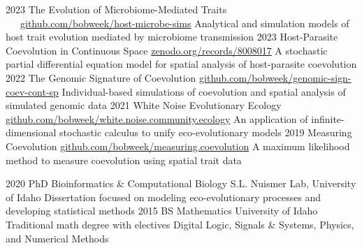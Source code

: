 \documentclass[9pt]{developercv} %
\begin{document}
\begin{entrylist}
        \entry
		{2023}
		{The Evolution of Microbiome-Mediated Traits}
		{\ \ \ \href{https://github.com/bobweek/host-microbe-sims}{github.com/bobweek/host-microbe-sims}}
		{%
        Analytical and simulation models of host trait evolution mediated by microbiome transmission}
        \entry
		{2023}
		{Host-Parasite Coevolution in Continuous Space}
		{\href{https://zenodo.org/records/8008017}{zenodo.org/records/8008017}}
		{%
        A stochastic partial differential equation model for spatial analysis of host-parasite coevolution}
	\entry
		{2022}
		{The Genomic Signature of Coevolution}
		{\href{https://github.com/bobweek/genomic-sign-coev-cont-sp}{github.com/bobweek/genomic-sign-coev-cont-sp}}
		{%
        Individual-based simulations of coevolution and spatial analysis of simulated genomic data}
	\entry
		{2021}
		{White Noise Evolutionary Ecology}
		{\href{https://github.com/bobweek/white.noise.community.ecology}{github.com/bobweek/white.noise.community.ecology}}
		{%
        An application of infinite-dimensional stochastic calculus to unify eco-evolutionary models}
    \entry
		{2019}
		{Measuring Coevolution}
		{\href{https://github.com/bobweek/measuring.coevolution}{github.com/bobweek/measuring.coevolution}}
		{%
        A maximum likelihood method to measure coevolution using spatial trait data}
\end{entrylist}

\vspace{-10 pt}
\begin{entrylist}
    \entry
		{2020}
		{PhD Bioinformatics \& Computational Biology}
		{S.L. Nuismer Lab, University of Idaho}
		{Dissertation focused on modeling eco-evolutionary processes and developing statistical methods}
    \entry
		{2015}
		{BS Mathematics}
		{University of Idaho}
		{Traditional math degree with electives Digital Logic, Signals \& Systems, Physics, and Numerical Methods}
\end{entrylist}
\end{document}
